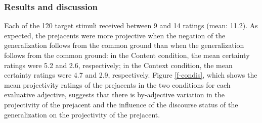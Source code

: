 \documentclass[11pt,fleqn]{article}
\newcommand{\6}{\mbox{$[\hspace*{-.6mm}[$}}
\newcommand{\9}{\mbox{$]\hspace*{-.6mm}]$}}
\begin{document}
\subsubsection{Results and discussion}

Each of the 120 target stimuli received between 9 and 14 ratings (mean: 11.2). As expected, the prejacents were more projective when the negation of the generalization follows from the common ground than when the generalization follows from the common ground: in the Content condition, the mean certainty ratings were 5.2 and 2.6, respectively; in the Context condition, the mean certainty ratings were 4.7 and 2.9, respectively. Figure \ref{f-condis}, which shows the mean projectivity ratings of the prejacents in the two conditions for each evaluative adjective, suggests that there is by-adjective variation in the projectivity of the prejacent and the influence of the discourse status of the generalization on the projectivity of the prejacent.
\end{document}
